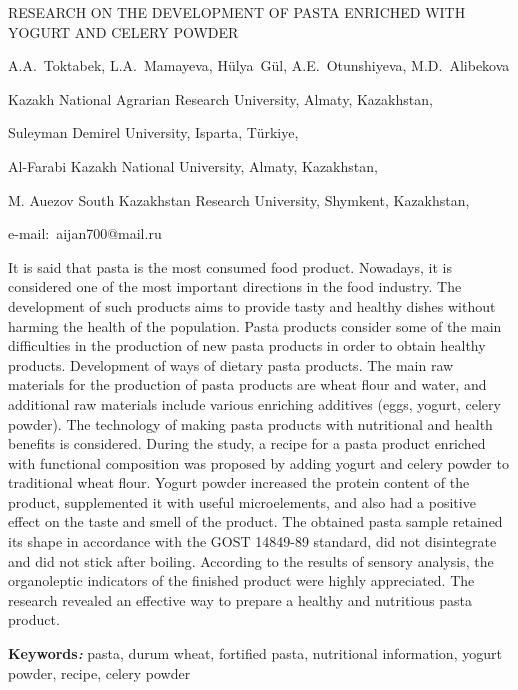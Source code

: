 \begin{header}
RESEARCH ON THE DEVELOPMENT OF PASTA ENRICHED WITH YOGURT AND CELERY POWDER

A.A.~Toktabek\envelope,
L.A.~Mamayeva,
Hülya~Gül,
A.E.~Otunshiyeva,
M.D.~Alibekova
\end{header}

\begin{affil}
Kazakh National Agrarian Research University, Almaty, Kazakhstan,

Suleyman Demirel University, Isparta, Türkiye,

Al-Farabi Kazakh National University, Almaty, Kazakhstan,

M. Auezov South Kazakhstan Research University, Shymkent, Kazakhstan,

e-mail:~aijan700@mail.ru
\end{affil}

It is said that pasta is the most consumed food product. Nowadays, it is
considered one of the most important directions in the food industry.
The development of such products aims to provide tasty and healthy
dishes without harming the health of the population. Pasta products
consider some of the main difficulties in the production of new pasta
products in order to obtain healthy products. Development of ways of
dietary pasta products. The main raw materials for the production of
pasta products are wheat flour and water, and additional raw materials
include various enriching additives (eggs, yogurt, celery powder). The
technology of making pasta products with nutritional and health benefits
is considered. During the study, a recipe for a pasta product enriched
with functional composition was proposed by adding yogurt and celery
powder to traditional wheat flour. Yogurt powder increased the protein
content of the product, supplemented it with useful microelements, and
also had a positive effect on the taste and smell of the product. The
obtained pasta sample retained its shape in accordance with the GOST
14849-89 standard, did not disintegrate and did not stick after boiling.
According to the results of sensory analysis, the organoleptic
indicators of the finished product were highly appreciated. The research
revealed an effective way to prepare a healthy and nutritious pasta
product.

{\bfseries Keywords\emph{:}} pasta, durum wheat, fortified pasta,
nutritional information, yogurt powder, recipe, celery powder

